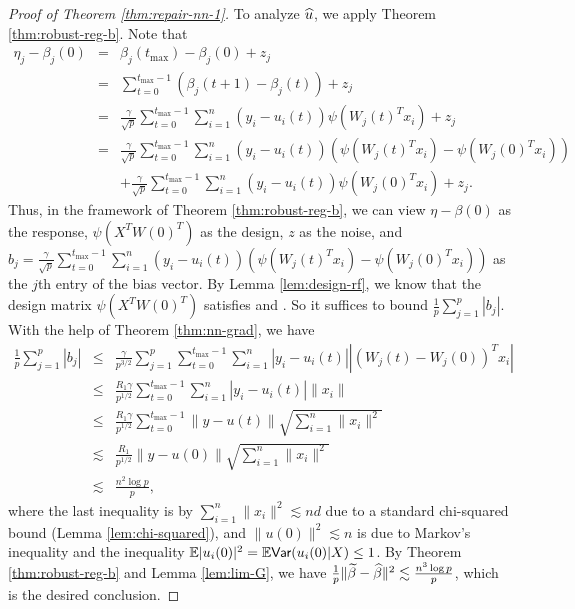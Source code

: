\begin{proof}[Proof of Theorem \ref{thm:repair-nn-1}]
To analyze $\widehat{u}$, we apply Theorem \ref{thm:robust-reg-b}. Note that
\begin{eqnarray*}
\eta_j - \beta_j(0) &=& \beta_j(t_{\max}) - \beta_j(0) +z_j \\
&=& \sum_{t=0}^{t_{\max}-1}\left(\beta_j(t+1)-\beta_j(t)\right) + z_j \\
&=& \frac{\gamma}{\sqrt{p}}\sum_{t=0}^{t_{\max}-1}\sum_{i=1}^n(y_i-u_i(t))\psi(W_j(t)^Tx_i) + z_j \\
&=& \frac{\gamma}{\sqrt{p}}\sum_{t=0}^{t_{\max}-1}\sum_{i=1}^n(y_i-u_i(t))(\psi(W_j(t)^Tx_i)-\psi(W_j(0)^Tx_i)) \\
&& + \frac{\gamma}{\sqrt{p}}\sum_{t=0}^{t_{\max}-1}\sum_{i=1}^n(y_i-u_i(t))\psi(W_j(0)^Tx_i) + z_j.
\end{eqnarray*}
Thus, in the framework of Theorem \ref{thm:robust-reg-b}, we can view $\eta-\beta(0)$ as the response, $\psi(X^TW(0)^T)$ as the design, $z$ as the noise, and $b_j=\frac{\gamma}{\sqrt{p}}\sum_{t=0}^{t_{\max}-1}\sum_{i=1}^n(y_i-u_i(t))(\psi(W_j(t)^Tx_i)-\psi(W_j(0)^Tx_i))$ as the $j$th entry of the bias vector. By Lemma \ref{lem:design-rf}, we know that the design matrix $\psi(X^TW(0)^T)$ satisfies \conditionA{} and \conditionB. So it suffices to bound $\frac{1}{p}\sum_{j=1}^p|b_j|$. With the help of Theorem \ref{thm:nn-grad}, we have
\begin{eqnarray*}
\frac{1}{p}\sum_{j=1}^p|b_j| &\leq& \frac{\gamma}{p^{3/2}}\sum_{j=1}^p\sum_{t=0}^{t_{\max}-1}\sum_{i=1}^n|y_i-u_i(t)||(W_j(t)-W_j(0))^Tx_i| \\
&\leq& \frac{R_1\gamma}{p^{1/2}}\sum_{t=0}^{t_{\max}-1}\sum_{i=1}^n|y_i-u_i(t)|\|x_i\| \\
&\leq& \frac{R_1\gamma}{p^{1/2}}\sum_{t=0}^{t_{\max}-1}\|y-u(t)\|\sqrt{\sum_{i=1}^n\|x_i\|^2} \\
&\lesssim& \frac{R_1}{p^{1/2}}\|y-u(0)\|\sqrt{\sum_{i=1}^n\|x_i\|^2} \\
&\lesssim& \frac{n^2\log p}{p},
\end{eqnarray*}
where the last inequality is by $\sum_{i=1}^n\|x_i\|^2\lesssim nd$ due to a standard chi-squared bound (Lemma \ref{lem:chi-squared}), and $\|u(0)\|^2\lesssim n$ is due to Markov's inequality and the inequality $\mathbb{E}|u_i(0)|^2 = \mathbb{E}\textsf{Var}(u_i(0)|X) \leq 1$. By Theorem \ref{thm:robust-reg-b} and Lemma \ref{lem:lim-G}, we have $\frac{1}{p}\|\widetilde{\beta}-\widehat{\beta}\|^2 \lesssim \frac{n^3\log p}{p}$, which is the desired conclusion.
\end{proof}

